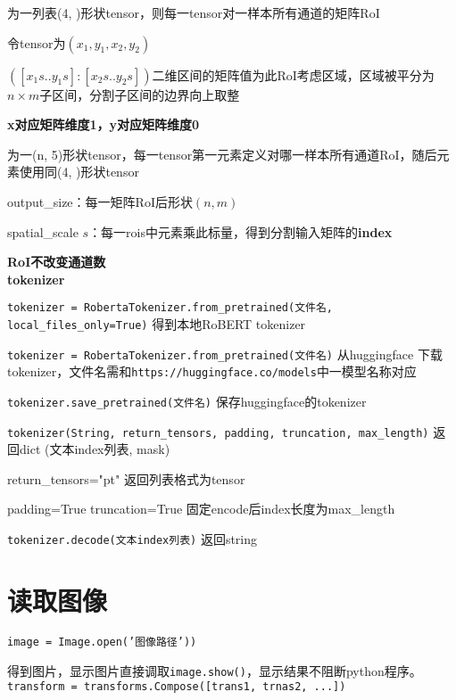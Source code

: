 \documentclass[UTF8]{ctexart}
\begin{document}
  \quad \quad 为一列表(4, )形状tensor，则每一tensor对一样本所有通道的矩阵RoI

  \quad \quad \quad 令tensor为$(x_1, y_1, x_2, y_2)$

  \quad \quad \quad $([x_1 s .. y_1 s]: [x_2 s .. y_2 s])$二维区间的矩阵值为此RoI考虑区域，区域被平分为$n \times m$子区间，分割子区间的边界向上取整

  \quad \quad \quad \textbf{x对应矩阵维度1，y对应矩阵维度0}

  \quad \quad 为一(n, 5)形状tensor，每一tensor第一元素定义对哪一样本所有通道RoI，随后元素使用同(4, )形状tensor

  \quad output\_size：每一矩阵RoI后形状$(n, m)$

  \quad spatial\_scale $s$：每一rois中元素乘此标量，得到分割输入矩阵的\textbf{index}

  \textbf{RoI不改变通道数}\\
\textbf{tokenizer}

  \texttt{tokenizer = RobertaTokenizer.from\_pretrained(文件名, local\_files\_only=True)} 得到本地RoBERT tokenizer

  \texttt{tokenizer = RobertaTokenizer.from\_pretrained(文件名)} 从huggingface 下载tokenizer，文件名需和\texttt{https://huggingface.co/models}中一模型名称对应

  \texttt{tokenizer.save\_pretrained(文件名)} 保存huggingface的tokenizer

  \texttt{tokenizer(String, return\_tensors, padding, truncation, max\_length)} 返回dict (文本index列表, mask)

  \quad return\_tensors="pt" 返回列表格式为tensor

  \quad padding=True truncation=True 固定encode后index长度为max\_length

  \texttt{tokenizer.decode(文本index列表)} 返回string

\section{读取图像}
\noindent \texttt{image = Image.open('图像路径'))}

  得到图片，显示图片直接调取\texttt{image.show()}，显示结果不阻断python程序。\\
\texttt{transform = transforms.Compose([trans1, trnas2, ...])}
\end{document}
